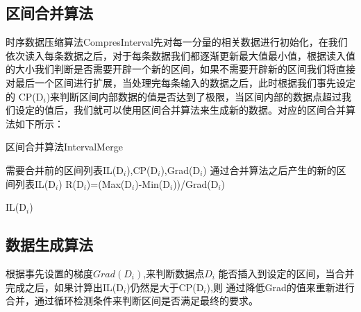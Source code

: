 \subsection{区间合并算法}
\label{section 3.15}
时序数据压缩算法CompresInterval先对每一分量的相关数据进行初始化，在我们依次读入每条数据之后，对于每条数据我们都逐渐更新最大值最小值，根据读入值
的大小我们判断是否需要开辟一个新的区间，如果不需要开辟新的区间我们将直接对最后一个区间进行扩展，当处理完每条输入的数据之后，此时根据我们事先设定的
CP(D$_{i}$)来判断区间内部数据的值是否达到了极限，当区间内部的数据点超过我们设定的值后，我们就可以使用区间合并算法来生成新的数据。对应的区间合并算法如下所示：

\begin{algorithm}
\caption{区间合并算法IntervalMerge}
\label{alg2}
\begin{algorithmic}[1]
\REQUIRE 需要合并前的区间列表IL(D$_{i}$),CP(D$_{i}$),Grad(D$_{i}$) 
\ENSURE 通过合并算法之后产生的新的区间列表IL(D$_{i}$)
\STATE  R(D$_{i}$)=(Max(D$_{i}$)-Min(D$_{i}$))/Grad(D$_{i}$)
\ENDFOR

\ENDWHILE
\RETURN IL(D$_{i}$)
\end{algorithmic}
\end{algorithm}


\subsection{数据生成算法}
\label{section 3.16}

根据事先设置的梯度$Grad(D_{i})$,来判断数据点$D_{i}$
能否插入到设定的区间，当合并完成之后，如果计算出IL(D$_{i}$)仍然是大于CP(D$_{i}$),则
通过降低Grad的值来重新进行合并，通过循环检测条件来判断区间是否满足最终的要求。


